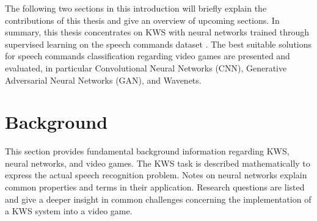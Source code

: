 The following two sections in this introduction will briefly explain the contributions of this thesis and give an overview of upcoming sections.
In summary, this thesis concentrates on KWS with neural networks trained through supervised learning on the speech commands dataset \cite{Warden2018SpeechCommands}.
The best suitable solutions for speech commands classification regarding video games are presented and evaluated, in particular Convolutional Neural Networks (CNN), Generative Adversarial Neural Networks (GAN), and Wavenets.







\chapter{Background}\label{sec:back}
This section provides fundamental background information regarding KWS, neural networks, and video games.
The KWS task is described mathematically to express the actual speech recognition problem.
Notes on neural networks explain common properties and terms in their application.
Research questions are listed and give a deeper insight in common challenges concerning the implementation of a KWS system into a video game.





